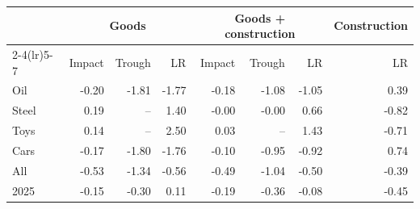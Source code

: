 \begin{tabular}{lrrrrrrr}
\toprule
 & \multicolumn{3}{c}{Goods} & \multicolumn{3}{c}{Goods + construction} & Construction \\
\cmidrule(lr){2-4}\cmidrule(lr){5-7}
 & Impact & Trough & LR & Impact & Trough & LR & LR \\
\midrule
Oil & -0.20 & -1.81 & -1.77 & -0.18 & -1.08 & -1.05 & 0.39 \\
Steel & 0.19 & -- & 1.40 & -0.00 & -0.00 & 0.66 & -0.82 \\
Toys & 0.14 & -- & 2.50 & 0.03 & -- & 1.43 & -0.71 \\
Cars & -0.17 & -1.80 & -1.76 & -0.10 & -0.95 & -0.92 & 0.74 \\
All & -0.53 & -1.34 & -0.56 & -0.49 & -1.04 & -0.50 & -0.39 \\
2025 & -0.15 & -0.30 & 0.11 & -0.19 & -0.36 & -0.08 & -0.45 \\
\bottomrule
\end{tabular}
